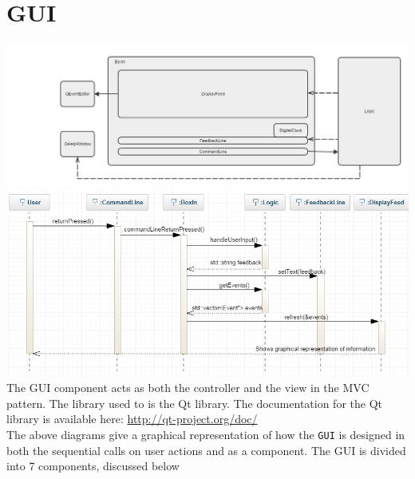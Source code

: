 \documentclass[12pt]{extarticle}
\begin{document}
\newpage
\section{GUI}

\includegraphics[width=\textwidth]{component_design_gui}
\includegraphics[width=\textwidth]{gui_sequence_diagram}
The GUI component acts as both the controller and the view in the MVC pattern. The library used to is the Qt library. The documentation for the Qt library is available here: \href{http://qt-project.org/doc/}{http://qt-project.org/doc/}\\
The above diagrams give a graphical representation of how the \texttt{GUI} is designed in both the sequential calls on user actions and as a component.
The GUI is divided into 7 components, discussed below
\end{document}
